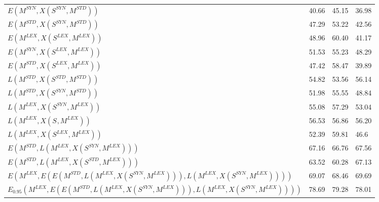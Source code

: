 \begin{table*}[]
\begin{tabular}{@{\makebox[1.25em][l]{\rownumber\space}}llll@{}}
$E(M^{SYN}, X(S^{SYN}, M^{STD}))$      & 40.66	&	45.15	&	36.98          \\ 
$E(M^{STD}, X(S^{SYN}, M^{STD}))$      & 47.29	&	53.22	&	42.56           \\
\midrule
$E(M^{LEX}, X(S^{LEX}, M^{LEX}))$      & 48.96	&	60.40	&	41.17           \\
$E(M^{SYN}, X(S^{LEX}, M^{LEX}))$      & 51.53	&	55.23	&	48.29          \\ 
$E(M^{STD}, X(S^{LEX}, M^{LEX}))$      & 47.42	&	58.47	&	39.89           \\

\midrule
%

$L(M^{STD}, X(S^{STD}, M^{STD}))$      & 54.82           & 53.56          & 56.14           \\ 
$L(M^{STD}, X(S^{SYN}, M^{STD}))$      & 51.98           & 55.55           & 48.84           \\  
$L(M^{LEX},  X(S^{SYN}, M^{LEX}))$      & 55.08           & 57.29          & 53.04           \\ 
$L(M^{LEX},  X(S^{}, M^{LEX}))$      & 56.53           & 56.86           & 56.20           \\  
$L(M^{LEX}, X(S^{LEX}, M^{LEX}))$      & 52.39           & 59.81           & 46.6	           \\  


 \midrule

$E(M^{STD}, L(M^{LEX}, X(S^{SYN}, M^{LEX})))$      & 67.16          & 66.76           & 67.56	          \\
$E(M^{STD}, L(M^{LEX}, X(S^{STD}, M^{LEX})))$      & 63.52          & 60.28           & 67.13	          \\
\midrule

$E(M^{LEX}, E(E(M^{STD}, L(M^{LEX}, X(S^{SYN}, M^{LEX}))), L(M^{LEX}, X(S^{SYN}, M^{LEX}))))$       & 69.07          & 68.46           & 69.69         \\
$E_{0.95}(M^{LEX}, E(E(M^{STD}, L(M^{LEX}, X(S^{SYN}, M^{LEX}))), L(M^{LEX}, X(S^{SYN}, M^{LEX}))))$       & 78.69          & 79.28           & 78.01         \\


\end{tabular}
\end{table*}
